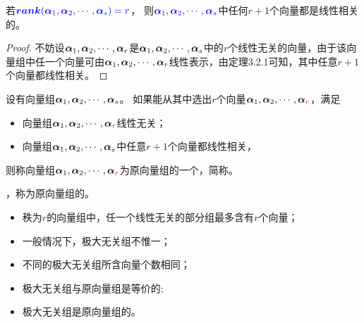 \begin{frame}
\begin{tuilun}
  若$\textcolor{blue}{\boldsymbol{rank}(\boldsymbol{\alpha}_1,\boldsymbol{\alpha}_2,\cdots,\boldsymbol{\alpha}_s)=r}$，
  则$\textcolor{blue}{\boldsymbol{\alpha}_1,\boldsymbol{\alpha}_2,\cdots,\boldsymbol{\alpha}_s}$中任何$r+1$个向量都是线性相关的。
\end{tuilun}
\pause  
\begin{proof}
不妨设$\boldsymbol{\alpha}_1,\boldsymbol{\alpha}_2,\cdots,\boldsymbol{\alpha}_r$是$\boldsymbol{\alpha}_1,\boldsymbol{\alpha}_2,\cdots,\boldsymbol{\alpha}_s$中的$r$个线性无关的向量，由于该向量组中任一个向量可由$\boldsymbol{\alpha}_1,\boldsymbol{\alpha}_2,\cdots,\boldsymbol{\alpha}_r$线性表示，由定理3.2.1可知，其中任意$r+1$个向量都线性相关。
\end{proof}
\end{frame}

\begin{frame}
\begin{dingyi}
  设有向量组$\boldsymbol{\alpha}_1,\boldsymbol{\alpha}_2,\cdots,\boldsymbol{\alpha}_s$。
  如果能从其中选出$r$个向量$\boldsymbol{\alpha}_1,\boldsymbol{\alpha}_2,\cdots,\boldsymbol{\alpha}_{\textcolor{red}{r}}$，满足
  \begin{itemize}
  \item 向量组$\boldsymbol{\alpha}_1,\boldsymbol{\alpha}_2,\cdots,\boldsymbol{\alpha}_{\textcolor{red}{r}}$线性无关；
  \item 向量组$\boldsymbol{\alpha}_1,\boldsymbol{\alpha}_2,\cdots,\boldsymbol{\alpha}_s$中任意$r+1$个向量都线性相关，
  \end{itemize}
  则称向量组$\boldsymbol{\alpha}_1,\boldsymbol{\alpha}_2,\cdots,\boldsymbol{\alpha}_{\textcolor{red}{r}}$为原向量组的一个，简称。 
  \vspace{0.1in}

  ，称为原向量组的。
\end{dingyi}
\end{frame}

\begin{frame}
\begin{zhu}
  \begin{itemize}
  \item   秩为$r$的向量组中，任一个线性无关的部分组最多含有$r$个向量；
  \item 一般情况下，极大无关组不惟一；
  \item 不同的极大无关组所含向量个数相同；
  \item 极大无关组与原向量组是等价的;
  \item 极大无关组是原向量组的。
  \end{itemize}
\end{zhu}
\end{frame}

